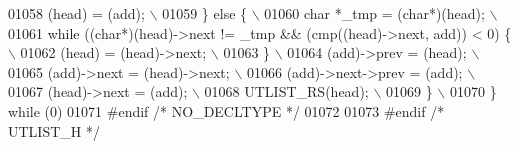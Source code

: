 \begin{DoxyCode}
01058 \textcolor{preprocessor}{    (head) = (add);                                                                            \(\backslash\)}
01059 \textcolor{preprocessor}{  \} else \{                                                                                     \(\backslash\)}
01060 \textcolor{preprocessor}{    char *\_tmp = (char*)(head);                                                                \(\backslash\)}
01061 \textcolor{preprocessor}{    while ((char*)(head)->next != \_tmp && (cmp((head)->next, add)) < 0) \{                      \(\backslash\)}
01062 \textcolor{preprocessor}{      (head) = (head)->next;                                                                   \(\backslash\)}
01063 \textcolor{preprocessor}{    \}                                                                                          \(\backslash\)}
01064 \textcolor{preprocessor}{    (add)->prev = (head);                                                                      \(\backslash\)}
01065 \textcolor{preprocessor}{    (add)->next = (head)->next;                                                                \(\backslash\)}
01066 \textcolor{preprocessor}{    (add)->next->prev = (add);                                                                 \(\backslash\)}
01067 \textcolor{preprocessor}{    (head)->next = (add);                                                                      \(\backslash\)}
01068 \textcolor{preprocessor}{    UTLIST\_RS(head);                                                                           \(\backslash\)}
01069 \textcolor{preprocessor}{  \}                                                                                            \(\backslash\)}
01070 \textcolor{preprocessor}{\} while (0)}
01071 \textcolor{preprocessor}{#endif }\textcolor{comment}{/* NO\_DECLTYPE */}\textcolor{preprocessor}{}
01072 
01073 \textcolor{preprocessor}{#endif }\textcolor{comment}{/* UTLIST\_H */}\textcolor{preprocessor}{}
\end{DoxyCode}
